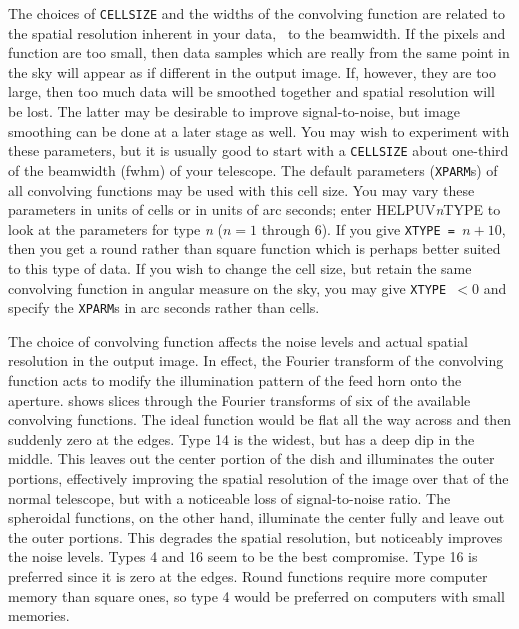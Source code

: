      The choices of {\tt CELLSIZE} and the widths of the convolving
function are related to the spatial resolution inherent in your data,
\ie\ to the  beamwidth.  If the pixels and function
are too small, then data samples which are really from the same point
in the sky will appear as if different in the output image. If,
however, they are too large, then too much data will be smoothed
together and spatial resolution will be lost.  The latter may be
desirable to improve signal-to-noise, but image smoothing can be done
at a later stage as well.  You may wish to experiment with these
parameters, but it is usually good to start with a {\tt CELLSIZE}
about one-third of the beamwidth (fwhm) of your telescope.  The
default parameters ({\tt XPARM}s) of all convolving functions may be
used with this cell size.  You may vary these parameters in units of
cells or in units of arc seconds; enter {\us HELP\qs UV{\it n\/}TYPE
\CR} to look at the parameters for type {\it n\/} ($n = 1$ through 6).
If you give {\tt XTYPE = $n+10$}, then you get a round rather than
square function which is perhaps better suited to this type of data.
If you wish to change the cell size, but retain the same convolving
function in angular measure on the sky, you may give {\tt XTYPE $< 0$}
and specify the {\tt XPARM}s in arc seconds rather than cells.

     The choice of convolving function affects the noise levels and
actual spatial resolution in the output image.  In effect, the Fourier
transform of the convolving function acts to modify the illumination
pattern of the feed horn onto the aperture.   shows
slices through the Fourier transforms of six of the available
convolving functions.  The ideal function would be flat all the way
across and then suddenly zero at the edges.  Type 14 is the widest,
but has a deep dip in the middle.  This leaves out the center portion
of the dish and illuminates the outer portions, effectively improving
the spatial resolution of the image over that of the normal telescope,
but with a noticeable loss of signal-to-noise ratio.  The spheroidal
functions, on the other hand, illuminate the center fully and leave
out the outer portions.  This degrades the spatial resolution, but
noticeably improves the noise levels.  Types 4 and 16 seem to be the
best compromise.  Type 16 is preferred since it is zero at the edges.
Round functions require more computer memory than square ones, so type
4 would be preferred on computers with small memories.

